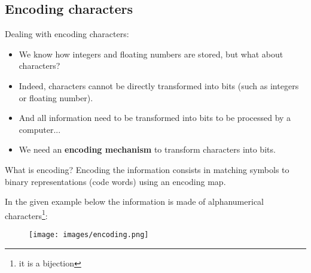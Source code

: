 \documentclass[handout]{beamer}[10pt, usepdftitle=false]
\begin{document}
	\subsection{Encoding characters}	
		  
	\begin{frame}
	
	Dealing with encoding characters:
	\vspace*{0.6em}	
	
	\begin{itemize}	
	\item{We know how integers and floating numbers are stored, but what about characters?}	
	\item{Indeed, characters cannot be directly transformed into bits (such as integers or floating number).}
	\item{And all information need to be transformed into bits to be processed by a computer...}	
	\item{We need an \textbf{encoding mechanism} to transform characters into bits.}
	\end{itemize}
	
	\end{frame}

	\begin{frame}
	
	What is encoding? Encoding the information consists in matching symbols to binary representations (code words) using an encoding map.
	\vspace*{0.5em}
	
	In the given example below the information is made of alphanumerical characters\footnote{it is a bijection}:	
		\vspace*{1em}
	
	\begin{center}	
	\begin{figure}
		\texttt{[image: images/encoding.png]} 
	\end{figure}	
	\end{center}
		
	\end{frame}
\end{document}
